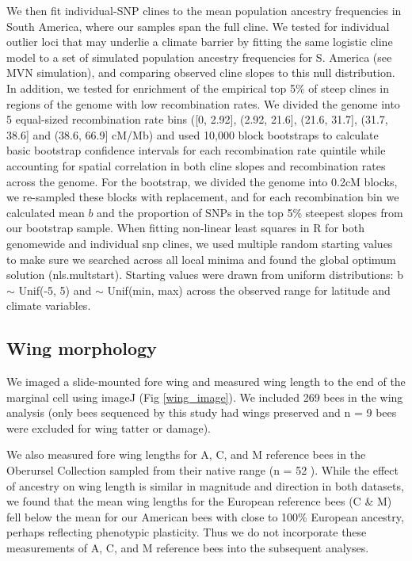 We then fit individual-SNP clines to the mean population ancestry frequencies in South America, where our samples span the full cline. We tested for individual outlier loci that may underlie a climate barrier by fitting the same logistic cline model to a set of simulated population ancestry frequencies for S. America (see MVN simulation), and comparing observed cline slopes to this null distribution. In addition, we tested for enrichment of the empirical top 5\% of steep clines in regions of the genome with low recombination rates. We divided the genome into 5 equal-sized recombination rate bins ([0, 2.92], (2.92, 21.6], (21.6, 31.7], (31.7, 38.6] and (38.6, 66.9] cM/Mb) and used 10,000 block bootstraps \cite{Bickel:2010cl} to calculate basic bootstrap confidence intervals for each recombination rate quintile while accounting for spatial correlation in both cline slopes and recombination rates across the genome. For the bootstrap, we divided the genome into 0.2cM blocks, we re-sampled these blocks with replacement, and for each recombination bin we calculated mean $b$ and the proportion of SNPs in the top 5\% steepest slopes from our bootstrap sample. When fitting non-linear least squares in R for both genomewide and individual snp clines, we used multiple random starting values to make sure we searched across all local minima and found the global optimum solution (nls.multstart). Starting values were drawn from uniform distributions: b $\sim$ Unif(-5, 5) and $\sim$ Unif(min, max) across the observed range for latitude and climate variables.

\subsection*{Wing morphology}
We imaged a slide-mounted fore wing and measured wing length to the end of the marginal cell using imageJ (Fig \ref{wing_image}). We included 269 bees in the wing analysis (only bees sequenced by this study had wings preserved and n = 9 bees were excluded for wing tatter or damage).

We also measured fore wing lengths for A, C, and M reference bees in the Oberursel Collection sampled from their native range (n = 52 \cite{Ruttner:Morph}). While the effect of ancestry on wing length is similar in magnitude and direction in both datasets, we found that the mean wing lengths for the European reference bees (C \& M) fell below the mean for our American bees with close to 100\% European ancestry, perhaps reflecting phenotypic plasticity. Thus we do not incorporate these measurements of A, C, and M reference bees into the subsequent analyses.

